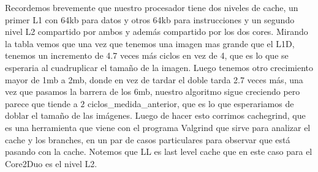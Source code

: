 \documentclass[a4paper]{article}
\begin{document}
Recordemos brevemente que nuestro procesador tiene dos niveles de cache, un primer L1 con 64kb para datos y otros 64kb para instrucciones y un segundo nivel L2 compartido por ambos y además compartido por los dos cores. Mirando la tabla vemos que una vez que tenemos una imagen mas grande que el L1D, tenemos un incremento de 4.7 veces más ciclos en vez de 4, que es lo que se esperaria al cuadruplicar el tamaño de la imagen. Luego tenemos otro crecimiento mayor de 1mb a 2mb, donde en vez de tardar el doble tarda 2.7 veces más, una vez que pasamos la barrera de los 6mb, nuestro algoritmo sigue creciendo pero parece que tiende a $2$ ciclos\_medida\_anterior, que es lo que esperariamos de doblar el tamaño de las imágenes.
Luego de hacer esto corrimos cachegrind, que es una herramienta que viene con el programa Valgrind que sirve para analizar el cache y los branches, en un par de casos particulares para observar que está pasando con la cache. Notemos que LL es last level cache que en este caso para el Core2Duo es el nivel L2.
\end{document}
